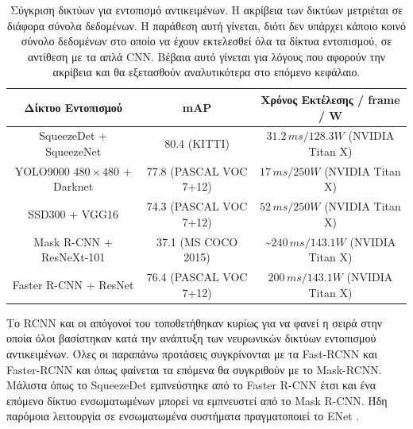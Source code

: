 \begin{table}
\vspace{-5em}
\begin{tabular}{c|c|c} 
 Δίκτυο Εντοπισμού & mAP & Χρόνος Εκτέλεσης / frame / W \\
\hline
SqueezeDet + SqueezeNet & 80.4 (KITTI)&$31.2\, ms / 128.3 W$ (NVIDIA Titan X)\\ %
YOLO9000 $480\times480$ + Darknet & 77.8 (PASCAL VOC 7+12) & $ 17\, ms / 250 W$ (NVIDIA Titan X) \\ %
SSD300 + VGG16 & 74.3 (PASCAL VOC 7+12) & $ 52\,ms / 250 W$ (NVIDIA Titan X) \\
Mask R-CNN + ResNeXt-101 & 37.1 (MS COCO 2015) & \~$240\,ms / 143.1 W$ (NVIDIA Titan X)\\
Faster R-CNN + ResNet & 76.4 (PASCAL VOC 7+12)& $200\,ms / 143.1 W$ (NVIDIA Titan X)\\
\hline
\end{tabular}
\caption[Σύγκριση δικτύων για εντοπισμό αντικειμένων]{Σύγκριση δικτύων για εντοπισμό αντικειμένων. Η ακρίβεια των δικτύων μετριέται σε διάφορα σύνολα δεδομένων. Η παράθεση αυτή γίνεται, διότι δεν υπάρχει κάποιο κοινό σύνολο δεδομένων στο οποίο να έχουν εκτελεσθεί όλα τα δίκτυα εντοπισμού, σε αντίθεση με τα απλά CNN. Βέβαια αυτό γίνεται για λόγους που αφορούν την ακρίβεια και θα εξετασθούν αναλυτικότερα στο επόμενο κεφάλαιο.}
\label{table:detCnnComp}
\end{table}

Το RCNN και οι απόγονοί του τοποθετήθηκαν κυρίως για να φανεί η σειρά στην οποία όλοι βασίστηκαν κατά την ανάπτυξη των νευρωνικών δικτύων εντοπισμού αντικειμένων. Όλες οι παραπάνω προτάσεις συγκρίνονται με τα Fast-RCNN και Faster-RCNN και όπως φαίνεται τα επόμενα θα συγκριθούν με το Mask-RCNN. Μάλιστα όπως το SqueezeDet εμπνεύστηκε από το Faster R-CNN έτσι και ένα επόμενο δίκτυο ενσωματωμένων μπορεί να εμπνευστεί από το Mask R-CNN. Ήδη παρόμοια λειτουργία σε ενσωματωμένα συστήματα πραγματοποιεί το ENet \cite{16}.
